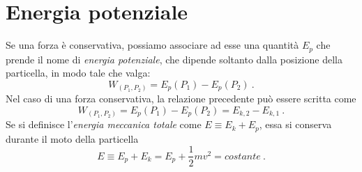 \documentclass[12pt, oneside]{book}
\begin{document}
\section{Energia potenziale}
Se una forza è conservativa, possiamo associare ad esse una quantità $E_p$ che prende il nome di \emph{energia potenziale}, che dipende soltanto dalla posizione della particella, in modo tale che valga:
\[W_{(P_1,P_2)}=E_p (P_1)-E_p (P_2)~.\]
Nel caso di una forza conservativa, la relazione precedente può essere scritta come 
\[W_{(P_1,P_2)}=E_p (P_1)-E_p (P_2)=E_{k,2}-E_{k,1}~.\]
Se si definisce l'\emph{energia meccanica totale} come $E\equiv E_k+E_p$, essa si conserva durante il moto della particella
\[E\equiv E_p + E_k=E_p+\dfrac{1}{2}mv^2=costante~.\]















































\newpage
\theendnotes
\end{document}
